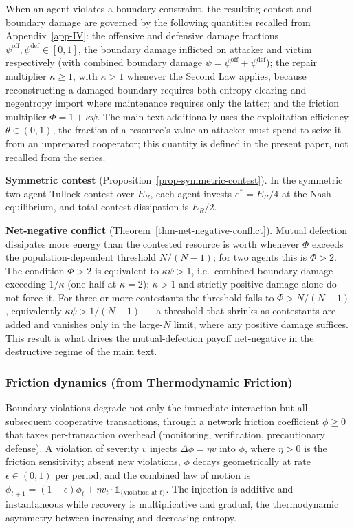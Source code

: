 \documentclass[11pt]{article}
\theoremstyle{plain}
\theoremstyle{definition}
\theoremstyle{remark}
\let\origsubsubsection\subsubsection
\renewcommand{\subsubsection}{\needspace{4\baselineskip}\origsubsubsection}
\begin{document}
When an agent violates a boundary constraint, the resulting contest and
boundary damage are governed by the following quantities recalled from
Appendix~\ref{app-IV}: the offensive and defensive damage fractions
\(\psi^{\text{off}}, \psi^{\text{def}} \in [0,1]\), the boundary damage
inflicted on attacker and victim respectively (with combined boundary
damage \(\psi = \psi^{\text{off}} + \psi^{\text{def}}\)); the repair
multiplier \(\kappa \geq 1\), with \(\kappa > 1\) whenever the Second
Law applies, because reconstructing a damaged boundary requires both
entropy clearing and negentropy import where maintenance requires only
the latter; and the friction multiplier \(\Phi = 1 + \kappa\psi\). The
main text additionally uses the exploitation efficiency
\(\theta \in (0,1)\), the fraction of a resource's value an attacker
must spend to seize it from an unprepared cooperator; this quantity is
defined in the present paper, not recalled from the series.

\textbf{Symmetric contest} (Proposition~\ref{prop-symmetric-contest}).
In the symmetric two-agent Tullock contest over \(E_R\), each agent
invests \(e^* = E_R/4\) at the Nash equilibrium, and total contest
dissipation is \(E_R/2\).

\textbf{Net-negative conflict}
(Theorem~\ref{thm-net-negative-conflict}). Mutual defection dissipates
more energy than the contested resource is worth whenever \(\Phi\)
exceeds the population-dependent threshold \(N/(N-1)\); for two agents
this is \(\Phi > 2\). The condition \(\Phi > 2\) is equivalent to
\(\kappa\psi > 1\), i.e.~combined boundary damage exceeding \(1/\kappa\)
(one half at \(\kappa = 2\)); \(\kappa > 1\) and strictly positive
damage alone do not force it. For three or more contestants the
threshold falls to \(\Phi > N/(N-1)\), equivalently
\(\kappa\psi > 1/(N-1)\) --- a threshold that shrinks as contestants are
added and vanishes only in the large-\(N\) limit, where any positive
damage suffices. This result is what drives the mutual-defection payoff
net-negative in the destructive regime of the main text.

\subsubsection{Friction dynamics (from Thermodynamic
Friction)}\label{friction-dynamics-from-thermodynamic-friction}

Boundary violations degrade not only the immediate interaction but all
subsequent cooperative transactions, through a network friction
coefficient \(\phi \geq 0\) that taxes per-transaction overhead
(monitoring, verification, precautionary defense). A violation of
severity \(v\) injects \(\Delta\phi = \eta v\) into \(\phi\), where
\(\eta > 0\) is the friction sensitivity; absent new violations,
\(\phi\) decays geometrically at rate \(\epsilon \in (0,1)\) per period;
and the combined law of motion is
\(\phi_{t+1} = (1-\epsilon)\phi_t + \eta v_t \cdot \mathds{1}_{\{\text{violation at } t\}}\).
The injection is additive and instantaneous while recovery is
multiplicative and gradual, the thermodynamic asymmetry between
increasing and decreasing entropy.
\end{document}
